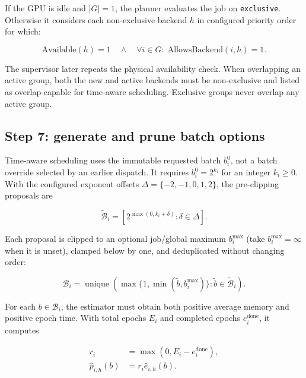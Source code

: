 \documentclass[11pt]{article}
\newcommand{\code}[1]{\textcolor{codeblue}{\texttt{#1}}}
\begin{document}
If the GPU is idle and $|G|=1$, the planner evaluates the job on
\code{exclusive}.  Otherwise it considers each non-exclusive backend $h$ in
configured priority order for which:

\begin{equation}
  \mathrm{Available}(h)=1
  \quad\land\quad
  \forall i\in G:\;\mathrm{AllowsBackend}(i,h)=1.
  \label{eq:backend-filter}
\end{equation}

The supervisor later repeats the physical availability check.  When overlapping
an active group, both the new and active backends must be non-exclusive and
listed as overlap-capable for time-aware scheduling.  Exclusive groups never
overlap any active group.

\subsection{Step 7: generate and prune batch options}

Time-aware scheduling uses the immutable requested batch $b_i^0$, not a batch
override selected by an earlier dispatch.  It requires $b_i^0=2^{k_i}$ for an
integer $k_i\ge0$.  With the configured exponent offsets
$\Delta=\{-2,-1,0,1,2\}$, the pre-clipping proposals are

\begin{equation}
  \widetilde{\mathcal B}_i
  =\left[2^{\max(0,k_i+\delta)}:\delta\in\Delta\right].
  \label{eq:batch-proposals}
\end{equation}

Each proposal is clipped to an optional job/global maximum $b_i^{\max}$
(take $b_i^{\max}=\infty$ when it is unset),
clamped below by one, and deduplicated without changing order:

\begin{equation}
  \mathcal B_i
  =\operatorname{unique}
    \left(\max\{1,\min(\widetilde b,b_i^{\max})\}:
    \widetilde b\in\widetilde{\mathcal B}_i\right).
  \label{eq:batch-clipping}
\end{equation}

For each $b\in\mathcal B_i$, the estimator must obtain both positive average
memory and positive epoch time.  With total epochs $E_i$ and completed epochs
$e_i^{\mathrm{done}}$, it computes

\begin{align}
  r_i &= \max(0,E_i-e_i^{\mathrm{done}}), \\
  \widehat p_{i,h}(b) &= r_i\widehat e_{i,h}(b).
  \label{eq:remaining-runtime}
\end{align}
\end{document}
